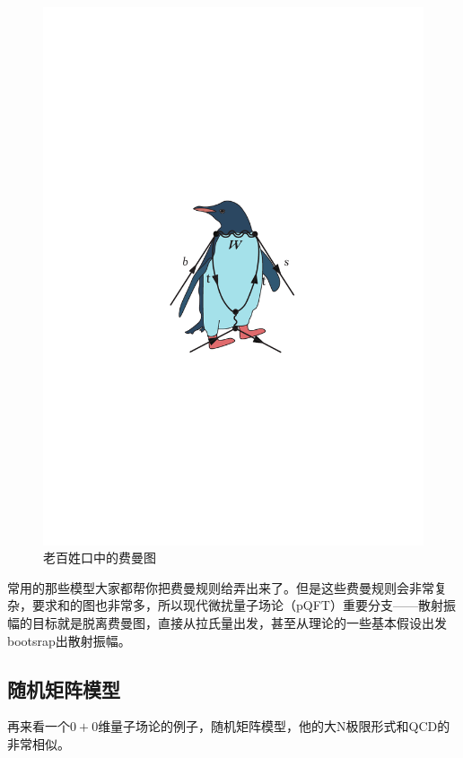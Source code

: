 	\begin{figure}[H]
		\centering
		\includegraphics[scale=0.3]{figs/penguin.pdf}
		\caption{老百姓口中的费曼图}
	\end{figure}
	
	常用的那些模型大家都帮你把费曼规则给弄出来了。但是这些费曼规则会非常复杂，要求和的图也非常多，所以现代微扰量子场论（pQFT）重要分支——散射振幅的目标就是脱离费曼图，直接从拉氏量出发，甚至从理论的一些基本假设出发bootsrap出散射振幅。
\subsection{随机矩阵模型}
再来看一个$0+0$维量子场论的例子，随机矩阵模型，他的大N极限形式和QCD的非常相似。

